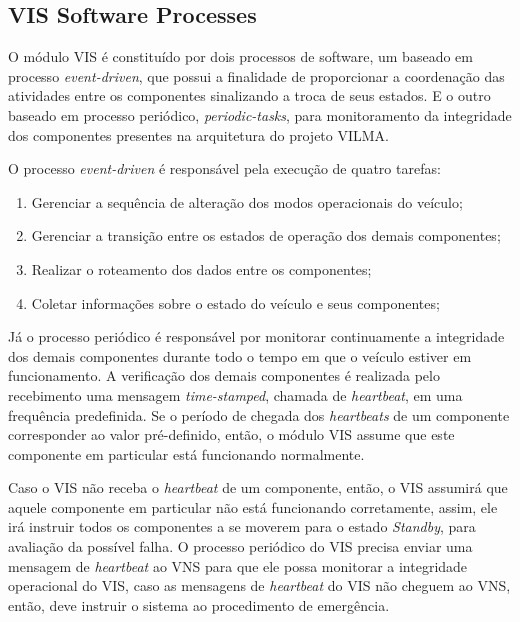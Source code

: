 \documentclass[conference]{IEEEtran}
\begin{document}
%
%
\subsection{VIS Software Processes}\label{subsec:vis_software_processes}

O módulo VIS é constituído por dois processos de software, um baseado em processo \textit{event-driven}, que possui a finalidade de proporcionar a coordenação das atividades entre os componentes sinalizando a troca de seus estados. E o outro baseado em processo periódico, \textit{periodic-tasks}, para monitoramento da integridade dos componentes presentes na arquitetura do projeto VILMA.

O processo \textit{event-driven} é responsável pela execução de quatro tarefas: 
\begin{enumerate}
	\item Gerenciar a sequência de alteração dos modos operacionais do veículo;
	\item Gerenciar a transição entre os estados de operação dos demais componentes;
	\item Realizar o roteamento dos dados entre os componentes;
	\item Coletar informações sobre o estado do veículo e seus componentes;
\end{enumerate}

Já o processo periódico é responsável por monitorar continuamente a integridade dos demais componentes durante todo o tempo em que o veículo estiver em funcionamento. A verificação dos demais componentes é realizada pelo recebimento uma mensagem \textit{time-stamped}, chamada de \textit{heartbeat}, em uma frequência predefinida. Se o período de chegada dos \textit{heartbeats} de um componente corresponder ao valor pré-definido, então, o módulo VIS assume que este componente em particular está funcionando normalmente.

Caso o VIS não receba o \textit{heartbeat} de um componente, então, o VIS assumirá que aquele componente em particular não está funcionando corretamente, assim, ele irá instruir todos os componentes a se moverem para o estado \textit{Standby}, para avaliação da possível falha. O processo periódico do VIS precisa enviar uma mensagem de \textit{heartbeat} ao VNS para que ele possa monitorar a integridade operacional do VIS, caso as mensagens de \textit{heartbeat} do VIS não cheguem ao VNS, então, deve instruir o sistema ao procedimento de emergência.

\end{document}
